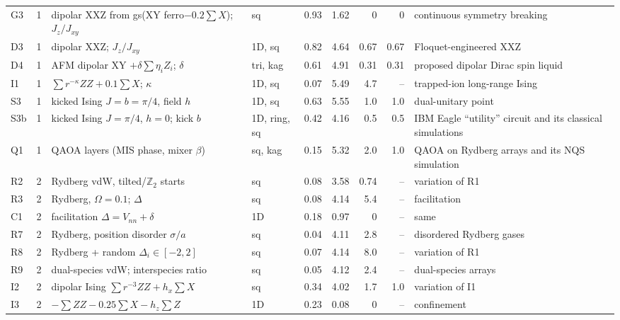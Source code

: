 \documentclass[11pt,a4paper]{article}
\begin{document}
\begin{table}[p]
\begin{tabular}{lcp{3.9cm}lrrrrp{4.2cm}}
    G3 & 1 & dipolar XXZ from gs(XY ferro$-0.2\sum X$); $J_z/J_{xy}$ & sq & 0.93 & 1.62 & 0 & 0 & continuous symmetry breaking~\cite{Chen23}\\
    D3 & 1 & dipolar XXZ; $J_z/J_{xy}$ & 1D, sq & 0.82 & 4.64 & 0.67 & 0.67 & Floquet-engineered XXZ~\cite{Scholl22,Geier21}\\
    D4 & 1 & AFM dipolar XY $+\delta\sum\eta_iZ_i$; $\delta$ & tri, kag & 0.61 & 4.91 & 0.31 & 0.31 & proposed dipolar Dirac spin liquid~\cite{Bintz24,Yao18}\\
    I1 & 1 & $\sum r^{-\kappa}ZZ+0.1\sum X$; $\kappa$ & 1D, sq & 0.07 & 5.49 & 4.7 & -- & trapped-ion long-range Ising~\cite{Richerme14,Jurcevic14,Schachenmayer13,Jurcevic17,Zhang17,Monroe21}\\
    S3 & 1 & kicked Ising $J=b=\pi/4$, field $h$ & 1D, sq & 0.63 & 5.55 & 1.0 & 1.0 & dual-unitary point~\cite{BKP18,BKP19}\\
    S3b & 1 & kicked Ising $J=\pi/4$, $h=0$; kick $b$ & 1D, ring, sq & 0.42 & 4.16 & 0.5 & 0.5 & IBM Eagle ``utility'' circuit and its classical simulations~\cite{Kim23,Tindall24,Begusic24}\\
    Q1 & 1 & QAOA layers (MIS phase, mixer $\beta$) & sq, kag & 0.15 & 5.32 & 2.0 & 1.0 & QAOA on Rydberg arrays and its NQS simulation~\cite{Ebadi22,MedvidovicCarleo21}\\
    \midrule
    R2 & 2 & Rydberg vdW, tilted/$\mathbb Z_2$ starts & sq & 0.08 & 3.58 & 0.74 & -- & variation of R1\\
    R3 & 2 & Rydberg, $\Omega=0.1$; $\Delta$ & sq & 0.08 & 4.14 & 5.4 & -- & facilitation~\cite{LesanovskyGarrahan13,Marcuzzi17}\\
    C1 & 2 & facilitation $\Delta=V_{nn}+\delta$ & 1D & 0.18 & 0.97 & 0 & -- & same\\
    R7 & 2 & Rydberg, position disorder $\sigma/a$ & sq & 0.04 & 4.11 & 2.8 & -- & disordered Rydberg gases~\cite{Marcuzzi17}\\
    R8 & 2 & Rydberg + random $\Delta_i\in[-2,2]$ & sq & 0.07 & 4.14 & 8.0 & -- & variation of R1\\
    R9 & 2 & dual-species vdW; interspecies ratio & sq & 0.05 & 4.12 & 2.4 & -- & dual-species arrays~\cite{Singh22}\\
    I2 & 2 & dipolar Ising $\sum r^{-3}ZZ+h_x\sum X$ & sq & 0.34 & 4.02 & 1.7 & 1.0 & variation of I1\\
    I3 & 2 & $-\sum ZZ-0.25\sum X-h_z\sum Z$ & 1D & 0.23 & 0.08 & 0 & -- & confinement~\cite{Kormos17,Tan21}\\

\end{tabular}
\end{table}
\end{document}
